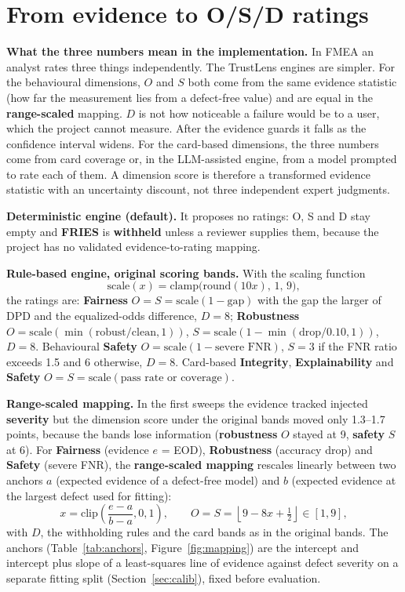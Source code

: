 \section{From evidence to O/S/D ratings}\label{sec:osd}
\textbf{What the three numbers mean in the implementation.} In FMEA an analyst rates three things independently. The TrustLens engines are simpler. For the behavioural dimensions, $O$ and $S$ both come from the same evidence statistic (how far the measurement lies from a defect-free value) and are equal in the \textbf{range-scaled} mapping. $D$ is not how noticeable a failure would be to a user, which the project cannot measure. After the evidence guards it falls as the confidence interval widens. For the card-based dimensions, the three numbers come from card coverage or, in the LLM-assisted engine, from a model prompted to rate each of them. A dimension score is therefore a transformed evidence statistic with an uncertainty discount, not three independent expert judgments.

\textbf{Deterministic engine (default).} It proposes no ratings: O, S and D stay empty and \textbf{FRIES} is \textbf{withheld} unless a reviewer supplies them, because the project has no validated evidence-to-rating mapping.

\textbf{Rule-based engine, original scoring bands.} With the scaling function
\begin{equation}
\mathrm{scale}(x)=\mathrm{clamp}\bigl(\mathrm{round}(10x),\,1,\,9\bigr),\label{eq:scale}
\end{equation}
the ratings are: \textbf{Fairness} $O=S=\mathrm{scale}(1-\mathrm{gap})$ with the gap the larger of DPD and the equalized-odds difference, $D=8$; \textbf{Robustness} $O=\mathrm{scale}(\min(\text{robust}/\text{clean},1))$, $S=\mathrm{scale}(1-\min(\text{drop}/0.10,1))$, $D=8$. Behavioural \textbf{Safety} $O=\mathrm{scale}(1-\text{severe FNR})$, $S=3$ if the FNR ratio exceeds 1.5 and $6$ otherwise, $D=8$. Card-based \textbf{Integrity}, \textbf{Explainability} and \textbf{Safety} $O=S=\mathrm{scale}(\text{pass rate or coverage})$.

\textbf{Range-scaled mapping.}\label{sec:v4} In the first sweeps the evidence tracked injected \textbf{severity} but the dimension score under the original bands moved only 1.3--1.7 points, because the bands lose information (\textbf{robustness} $O$ stayed at 9, \textbf{safety} $S$ at 6). For \textbf{Fairness} (evidence $e$ = EOD), \textbf{Robustness} (accuracy drop) and \textbf{Safety} (severe FNR), the \textbf{range-scaled mapping} rescales linearly between two anchors $a$ (expected evidence of a defect-free model) and $b$ (expected evidence at the largest defect used for fitting):
\begin{equation}
x=\mathrm{clip}\!\left(\frac{e-a}{b-a},0,1\right),\qquad O=S=\left\lfloor 9-8x+\tfrac12\right\rfloor\in[1,9],\label{eq:v4}
\end{equation}
with $D$, the withholding rules and the card bands as in the original bands. The anchors (Table~\ref{tab:anchors}, Figure~\ref{fig:mapping}) are the intercept and intercept plus slope of a least-squares line of evidence against defect severity on a separate fitting split (Section~\ref{sec:calib}), fixed before evaluation.

